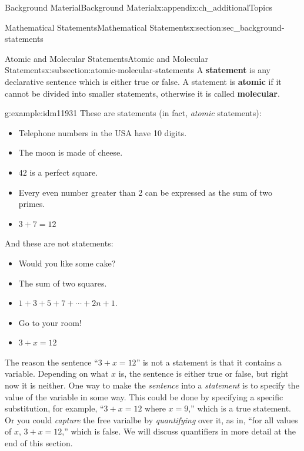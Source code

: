 \documentclass[oneside,10pt,]{book}
\newcommand{\terminology}[1]{\textbf{#1}}
\numberwithin{equation}{chapter}
\begin{document}
\begin{appendixptx}{Background Material}{}{Background Material}{}{}{x:appendix:ch_additionalTopics}
\begin{sectionptx}{Mathematical Statements}{}{Mathematical Statements}{}{}{x:section:sec_background-statements}
\begin{introduction}{}
\end{introduction}%
%
%
\typeout{************************************************}
\typeout{************************************************}
%
\begin{subsectionptx}{Atomic and Molecular Statements}{}{Atomic and Molecular Statements}{}{}{x:subsection:atomic-molecular-statements}
A \terminology{statement} is any declarative sentence which is either true or false. A statement is \terminology{atomic} if it cannot be divided into smaller statements, otherwise it is called \terminology{molecular}.%
\begin{example}{}{g:example:idm11931}%
These are statements (in fact, \emph{atomic} statements):%
\begin{itemize}[label=\textbullet]
\item{}Telephone numbers in the USA have 10 digits.%
\item{}The moon is made of cheese.%
\item{}42 is a perfect square.%
\item{}Every even number greater than 2 can be expressed as the sum of two primes.%
\item{}\(3+7 = 12\)%
\end{itemize}
And these are not statements:%
\begin{itemize}[label=\textbullet]
\item{}Would you like some cake?%
\item{}The sum of two squares.%
\item{}\(1+3+5+7+\cdots+2n+1\).%
\item{}Go to your room!%
\item{}\(3+x = 12\)%
\end{itemize}
%
\end{example}
The reason the sentence ``\(3 + x = 12\)'' is not a statement is that it contains a variable. Depending on what \(x\) is, the sentence is either true or false, but right now it is neither. One way to make the \emph{sentence} into a \emph{statement} is to specify the value of the variable in some way. This could be done by specifying a specific substitution, for example, ``\(3+x = 12\) where \(x = 9\),'' which is a true statement.  Or you could \emph{capture} the free varialbe by \emph{quantifying} over it, as in, ``for all values of \(x\), \(3+x = 12\),'' which is false. We will discuss quantifiers in more detail at the end of this section.%
\par

\end{subsectionptx}
\end{sectionptx}
\end{appendixptx}
\end{document}
